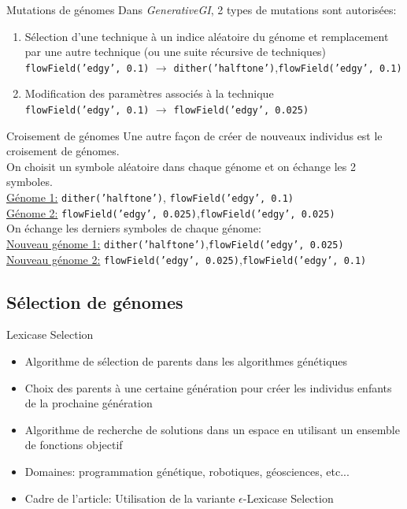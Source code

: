 \documentclass[aspectratio=169]{beamer}
\begin{document}
\begin{frame}{Mutations de génomes}
    Dans \textit{GenerativeGI}, 2 types de mutations sont autorisées:
    \begin{enumerate}
        \item Sélection d'une technique à un indice aléatoire du génome et remplacement par une autre technique (ou une suite récursive de techniques) \\
        \texttt{flowField('edgy', 0.1)} $\rightarrow$ \texttt{dither('halftone')},\texttt{flowField('edgy', 0.1)}
        \item Modification des paramètres associés à la technique \\
        \texttt{flowField('edgy', 0.1)} $\rightarrow$ \texttt{flowField('edgy', 0.025)}
    \end{enumerate}    
\end{frame}

\begin{frame}{Croisement de génomes}
    Une autre façon de créer de nouveaux individus est le croisement de génomes. \\
    On choisit un symbole aléatoire dans chaque génome et on échange les 2 symboles.\\
    \underline{Génome 1:} \texttt{dither('halftone')},\color{red} \texttt{flowField('edgy', 0.1)} \color{black}\\
    \underline{Génome 2:} \texttt{flowField('edgy', 0.025)},\color{red}\texttt{flowField('edgy', 0.025)} \color{black}\\
    On échange les derniers symboles de chaque génome:\\
    \underline{Nouveau génome 1:} \texttt{dither('halftone')},\color{red}\texttt{flowField('edgy', 0.025)} \color{black} \\
    \underline{Nouveau génome 2:} \texttt{flowField('edgy', 0.025)},\color{red}\texttt{flowField('edgy', 0.1)} \color{black} \\
\end{frame}

\subsection{Sélection de génomes}

\begin{frame}{Lexicase Selection}
    \begin{itemize}
        \item Algorithme de sélection de parents dans les algorithmes génétiques
        \item Choix des parents à une certaine génération pour créer les individus enfants de la prochaine génération 
        \item Algorithme de recherche de solutions dans un espace en utilisant un ensemble de fonctions objectif 
        \item Domaines: programmation génétique, robotiques, géosciences, etc... 
        \item Cadre de l'article: Utilisation de la variante $\epsilon$-Lexicase Selection
    \end{itemize}
\end{frame}
\end{document}
